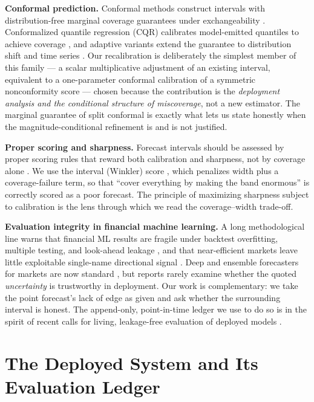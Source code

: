 \documentclass[11pt,a4paper]{article}
\begin{document}
\textbf{Conformal prediction.} Conformal methods construct intervals with
distribution-free marginal coverage guarantees under exchangeability
\cite{vovk2005,shafer2008,angelopoulos2023}. Conformalized quantile regression
(CQR) calibrates model-emitted quantiles to achieve coverage \cite{romano2019}, and
adaptive variants extend the guarantee to distribution shift and time series
\cite{gibbs2021,xu2023}. Our recalibration is deliberately the simplest member of
this family --- a scalar multiplicative adjustment of an existing interval, equivalent
to a one-parameter conformal calibration of a symmetric nonconformity score --- chosen
because the contribution is the \emph{deployment analysis and the conditional structure
of miscoverage}, not a new estimator. The marginal guarantee of split conformal is
exactly what lets us state honestly when the magnitude-conditional refinement is and
is not justified.

\textbf{Proper scoring and sharpness.} Forecast intervals should be assessed by
proper scoring rules that reward both calibration and sharpness, not by coverage
alone \cite{gneiting2007,gneiting2007probabilistic}. We use the interval (Winkler)
score \cite{winkler1972}, which penalizes width plus a coverage-failure term, so that
``cover everything by making the band enormous'' is correctly scored as a poor
forecast. The principle of maximizing sharpness subject to calibration
\cite{gneiting2007probabilistic} is the lens through which we read the
coverage--width trade-off.

\textbf{Evaluation integrity in financial machine learning.} A long methodological
line warns that financial ML results are fragile under backtest overfitting,
multiple testing, and look-ahead leakage \cite{bailey2014,harvey2016,lopez2018}, and
that near-efficient markets leave little exploitable single-name directional signal
\cite{fama1970,malkiel2003,welch2008}. Deep and ensemble forecasters for markets are
now standard \cite{fischer2018,gu2020}, but reports rarely examine whether the quoted
\emph{uncertainty} is trustworthy in deployment. Our work is complementary: we take
the point forecast's lack of edge as given and ask whether the surrounding interval
is honest. The append-only, point-in-time ledger we use to do so is in the spirit of
recent calls for living, leakage-free evaluation of deployed models
\cite{ovadia2019,lopez2018}.

\section{The Deployed System and Its Evaluation Ledger}\label{sec:system}
\end{document}
